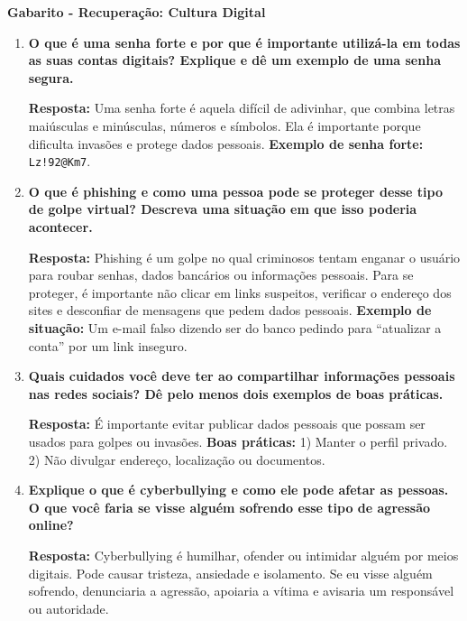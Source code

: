 \documentclass[11pt]{article}
\begin{document}
\begin{center}
    {\LARGE \textbf{Gabarito - Recuperação: Cultura Digital}}
\end{center}

\vspace{0.5cm}

\begin{enumerate}

\item \textbf{O que é uma senha forte e por que é importante utilizá-la em todas as suas contas digitais?  
Explique e dê um exemplo de uma senha segura.}  

\textbf{Resposta:}  
Uma senha forte é aquela difícil de adivinhar, que combina letras maiúsculas e minúsculas, números e símbolos. Ela é importante porque dificulta invasões e protege dados pessoais.  
\textbf{Exemplo de senha forte:} \texttt{Lz!92@Km7}.

\item \textbf{O que é phishing e como uma pessoa pode se proteger desse tipo de golpe virtual?  
Descreva uma situação em que isso poderia acontecer.}  

\textbf{Resposta:}  
Phishing é um golpe no qual criminosos tentam enganar o usuário para roubar senhas, dados bancários ou informações pessoais.  
Para se proteger, é importante não clicar em links suspeitos, verificar o endereço dos sites e desconfiar de mensagens que pedem dados pessoais.  
\textbf{Exemplo de situação:} Um e-mail falso dizendo ser do banco pedindo para “atualizar a conta” por um link inseguro.  

\item \textbf{Quais cuidados você deve ter ao compartilhar informações pessoais nas redes sociais?  
Dê pelo menos dois exemplos de boas práticas.}  

\textbf{Resposta:}  
É importante evitar publicar dados pessoais que possam ser usados para golpes ou invasões.  
\textbf{Boas práticas:}  
1) Manter o perfil privado.  
2) Não divulgar endereço, localização ou documentos.

\item \textbf{Explique o que é cyberbullying e como ele pode afetar as pessoas.  
O que você faria se visse alguém sofrendo esse tipo de agressão online?}  

\textbf{Resposta:}  
Cyberbullying é humilhar, ofender ou intimidar alguém por meios digitais. Pode causar tristeza, ansiedade e isolamento.  
Se eu visse alguém sofrendo, denunciaria a agressão, apoiaria a vítima e avisaria um responsável ou autoridade.


\end{enumerate}
\end{document}
